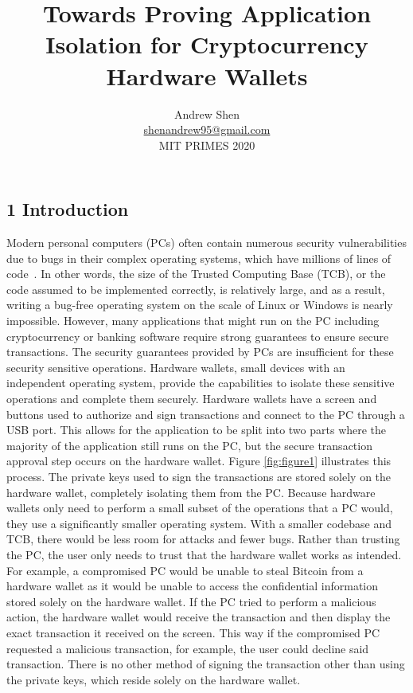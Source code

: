 \documentclass[]{article}
\begin{document}
\date{}
\title{Towards Proving Application Isolation for Cryptocurrency
Hardware
Wallets}\label{towards-proving-application-isolation-for-cryptocurrency-hardware-wallets}
\author{Andrew Shen \\ \href{mailto:shenandrew95@gmail.com}{shenandrew95@gmail.com} \\ MIT PRIMES 2020}

\maketitle

\subsection{1 Introduction}\label{introduction}

Modern personal computers (PCs) often contain numerous security vulnerabilities due to bugs in their complex operating systems, which have millions of lines of code~\cite{Linux}. In other words, the size of the Trusted Computing Base (TCB), or the code assumed to be implemented correctly, is relatively large, and as a result, writing a bug-free operating system on the scale of Linux or Windows is nearly impossible. However, many applications that might run on the PC including cryptocurrency or banking software require strong guarantees to ensure secure transactions. The security guarantees provided by PCs are insufficient for these security sensitive operations. Hardware wallets, small devices with an independent operating system, provide the capabilities to isolate these sensitive operations and complete them securely. Hardware wallets have a screen and buttons used to authorize and sign transactions and connect to the PC through a USB port. This allows for the application to be split into two parts where the majority of the application still runs on the PC, but the secure transaction approval step occurs on the hardware wallet. Figure \ref{fig:figure1} illustrates this process. The private keys used to sign the transactions are stored solely on the hardware wallet, completely isolating them from the PC. Because hardware wallets only need to perform a small subset of the operations that a PC would, they use a significantly smaller operating system. With a smaller codebase and TCB, there would be less room for attacks and fewer bugs. Rather than trusting the PC, the user only needs to trust that the hardware wallet works as intended. For example, a compromised PC would be unable to steal Bitcoin from a hardware wallet as it would be unable to access the confidential information stored solely on the hardware wallet. If the PC tried to perform a malicious action, the hardware wallet would receive the transaction and then display the exact transaction it received on the screen. This way if the compromised PC requested a malicious transaction, for example, the user could decline said transaction. There is no other method of signing the transaction other than using the private keys, which reside solely on the hardware wallet.
\end{document}
